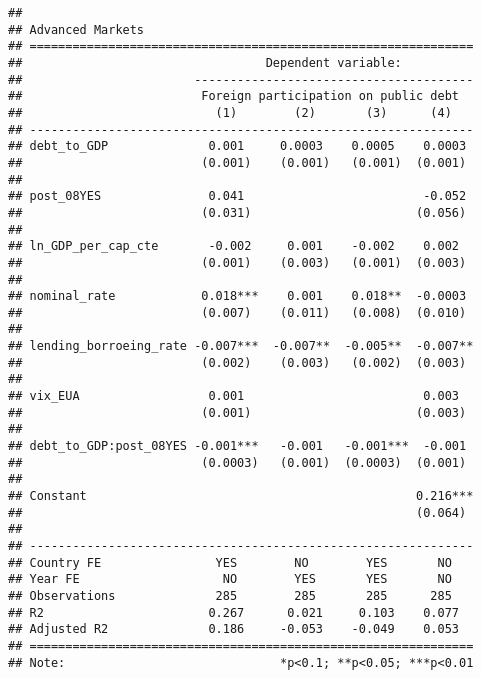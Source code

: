 \documentclass[
]{article}
\begin{document}
\begin{verbatim}
## 
## Advanced Markets
## ==============================================================
##                                  Dependent variable:          
##                        ---------------------------------------
##                         Foreign participation on public debt  
##                           (1)        (2)       (3)      (4)   
## --------------------------------------------------------------
## debt_to_GDP              0.001     0.0003    0.0005    0.0003 
##                         (0.001)    (0.001)   (0.001)  (0.001) 
##                                                               
## post_08YES               0.041                         -0.052 
##                         (0.031)                       (0.056) 
##                                                               
## ln_GDP_per_cap_cte       -0.002     0.001    -0.002    0.002  
##                         (0.001)    (0.003)   (0.001)  (0.003) 
##                                                               
## nominal_rate            0.018***    0.001    0.018**  -0.0003 
##                         (0.007)    (0.011)   (0.008)  (0.010) 
##                                                               
## lending_borroeing_rate -0.007***  -0.007**  -0.005**  -0.007**
##                         (0.002)    (0.003)   (0.002)  (0.003) 
##                                                               
## vix_EUA                  0.001                         0.003  
##                         (0.001)                       (0.003) 
##                                                               
## debt_to_GDP:post_08YES -0.001***   -0.001   -0.001***  -0.001 
##                         (0.0003)   (0.001)  (0.0003)  (0.001) 
##                                                               
## Constant                                              0.216***
##                                                       (0.064) 
##                                                               
## --------------------------------------------------------------
## Country FE                YES        NO        YES       NO   
## Year FE                    NO        YES       YES       NO   
## Observations              285        285       285      285   
## R2                       0.267      0.021     0.103    0.077  
## Adjusted R2              0.186     -0.053    -0.049    0.053  
## ==============================================================
## Note:                              *p<0.1; **p<0.05; ***p<0.01
\end{verbatim}
\end{document}

